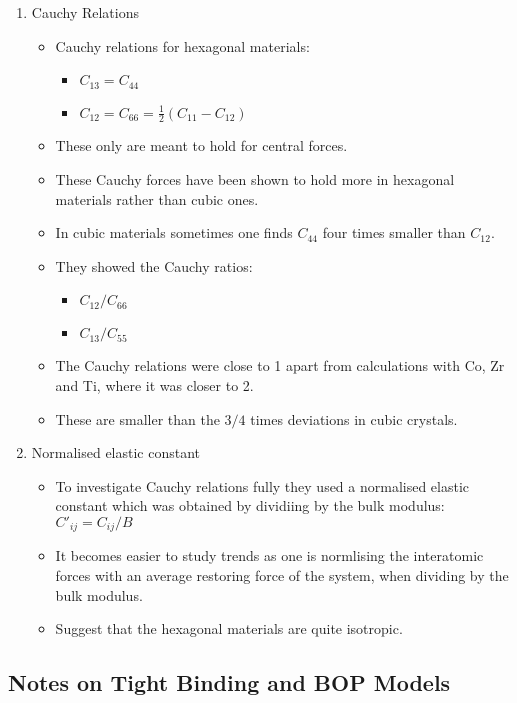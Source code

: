 \documentclass[11pt]{article}
\begin{document}
\begin{enumerate}
\item Cauchy Relations
\label{sec-2-4-2-1}
\begin{itemize}
\item Cauchy relations for hexagonal materials:
\begin{itemize}
\item $C_{13} = C_{44}$
\item $C_{12} = C_{66} = \frac{1}{2}(C_{11} - C_{12})$
\end{itemize}
\item These only are meant to hold for central forces.
\item These Cauchy forces have been shown to hold more in hexagonal materials
rather than cubic ones.
\item In cubic materials sometimes one finds $C_{44}$ four times smaller than
$C_{12}$.
\item They showed the Cauchy ratios:
\begin{itemize}
\item $C_{12}/C_{66}$
\item $C_{13}/C_{55}$
\end{itemize}
\item The Cauchy relations were close to 1 apart from calculations with Co, Zr and
Ti, where it was closer to 2.
\item These are smaller than the $3/4$ times deviations in cubic crystals.
\end{itemize}

\item Normalised elastic constant
\label{sec-2-4-2-2}
\begin{itemize}
\item To investigate Cauchy relations fully they used a normalised elastic constant which
was obtained by dividiing by the bulk modulus: $C'_{ij} = C_{ij}/B$
\item It becomes easier to study trends as one is normlising the
interatomic forces with an average restoring force of the system,
when dividing by the bulk modulus.
\item Suggest that the hexagonal materials are quite isotropic.
\end{itemize}
\end{enumerate}

\subsection{Notes on Tight Binding and BOP Models}
\label{sec-2-5}
\end{document}
